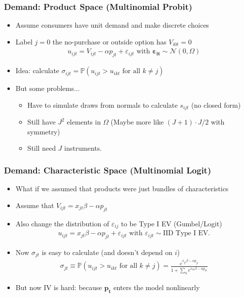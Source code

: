 \documentclass[aspectratio=169,10pt]{beamer}
\begin{document}
\begin{frame}
\frametitle{Demand: Product Space (Multinomial Probit)}

\begin{itemize}
    \item Assume consumers have unit demand and make discrete choices
    \item Label $j=0$ the no-purchase or outside option has $V_{i0t}=0$
    \begin{align*}
        u_{ijt} = V_{ijt} - \alpha p_{jt} +  \varepsilon_{ijt} \text{ with } \symbf{\varepsilon_{it}} \sim \mathcal{N}(0,\Omega)
    \end{align*}
    \item Idea: calculate $\sigma_{ijt} = \mathbb{P}(u_{ijt} > u_{ikt} \text{ for all } k \neq j)$
    \item But some problems...
    \begin{itemize}
        \item Have to \alert{simulate draws from normals} to calculate $s_{ijt}$ (no closed form)
        \item Still have $J^2$ elements in $\Omega$ (Maybe more like $(J+1) \cdot J / 2$ with symmetry)
        \item Still need $J$ instruments.
    \end{itemize}

\end{itemize}
\end{frame}



\begin{frame}
\frametitle{Demand: Characteristic Space (Multinomial Logit)}

\begin{itemize}
    \item What if we assumed that products were just bundles of characteristics
    \item Assume that $V_{ijt} = x_{jt} \beta - \alpha p_{jt}$
    \item Also change the distribution of $\varepsilon_{ij}$ to be Type I EV (Gumbel/Logit)
    \begin{align*}
        u_{ijt} = x_{jt} \beta- \alpha p_{jt} +  \varepsilon_{ijt} \text{ with } \varepsilon_{ijt} \sim \text{IID Type I EV}.
    \end{align*}
    \item Now $\sigma_{jt}$ is easy to calculate (and doesn't depend on $i$)
     \begin{align*}
          \sigma_{jt} \equiv \mathbb{P}(u_{ijt} > u_{ikt} \text{ for all } k \neq j)  = 
    \frac{e^{x_{jt} \beta- \alpha p_{jt}}}{1+\sum_k e^{x_{kt} \beta- \alpha p_{kt} }}
    \end{align*}
    \item But now IV is hard: because $\symbf{p_t}$ enters the model \alert{nonlinearly}
\end{itemize}
\end{frame}
\end{document}

